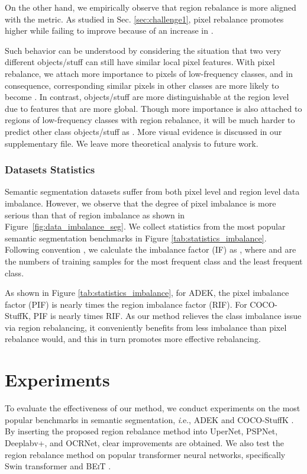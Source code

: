 \documentclass[final]{cvpr}
\begin{document}
On the other hand, we empirically observe that region rebalance is more aligned with the  metric. As studied in Sec. \ref{sec:challenge1}, pixel rebalance promotes higher  while failing to improve  because of an increase in . 

Such behavior can be understood by considering the situation that two very different objects/stuff can still have similar local pixel features. With pixel rebalance, we attach more importance to pixels of low-frequency classes, and in consequence, corresponding similar pixels in other classes are more likely to become . In contrast, objects/stuff are more distinguishable at the region level due to features that are more global. Though more importance is also attached to regions of low-frequency classes with region rebalance, it will be much harder to predict other class objects/stuff as . More visual evidence is discussed in our supplementary file. We leave more theoretical analysis to future work.


\vspace{-0.12in}
\subsubsection{Datasets Statistics}
\label{sec:datasets_stats}
Semantic segmentation datasets suffer from both pixel level and region level data imbalance. However, we observe that the degree of pixel imbalance is more serious than that of region imbalance as shown in Figure~\ref{fig:data_imbalance_seg}. We collect statistics from the most popular semantic segmentation benchmarks in Figure \ref{tab:statistics_imbalance}. Following convention \cite{cb-focal,liu2019large}, we calculate the imbalance factor (IF) as , where
 and  are the numbers of training samples for the most frequent class and the least frequent class.


As shown in Figure \ref{tab:statistics_imbalance}, for ADEK, the pixel imbalance factor (PIF) is nearly  times the region imbalance factor (RIF). For COCO-StuffK, PIF is nearly  times RIF. 
As our method relieves the class imbalance issue via region rebalancing, it conveniently benefits from less imbalance than pixel rebalance would, and this in turn promotes more effective rebalancing.


\section{Experiments}
To evaluate the effectiveness of our method, we conduct experiments on the most popular benchmarks in semantic segmentation, {\textit i.e.}, ADEK \cite{zhou2017scene} and COCO-StuffK \cite{caesar2018coco}. By inserting the proposed region rebalance method into UperNet, PSPNet, Deeplabv+, and OCRNet, clear improvements are obtained. We also test the region rebalance method on popular transformer neural networks, specifically Swin transformer \cite{liu2021swin} and \textsc{BEiT} \cite{bao2021beit}.   
\end{document}
